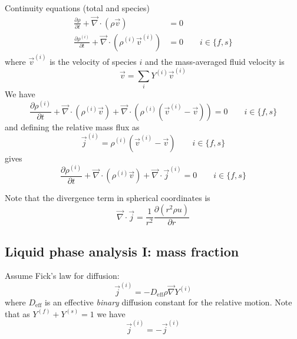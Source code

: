 \documentclass[11pt,twoside]{report}
\begin{document}
Continuity equations (total and species)
\begin{align}
  \label{eq:total-continuity}
  \frac{\partial \rho}{\partial t} +
  \vec{\nabla} \cdot (\rho \vec{v}) &= 0 \\
  \label{eq:species-continuity}
  \frac{\partial \rho^{(i)}}{\partial t} +
  \vec{\nabla} \cdot (\rho^{(i)} \vec{v}^{(i)}) &= 0
  \qquad i \in \{f,s\}
\end{align}
where $\vec{v}^{(i)}$ is the velocity of species $i$ and the mass-averaged fluid velocity is
\begin{equation}
  \vec{v} = \sum_i Y^{(i)} \vec{v}^{(i)}
\end{equation}
We have
\begin{equation*}
  \frac{\partial \rho^{(i)}}{\partial t} +
  \vec{\nabla} \cdot (\rho^{(i)} \vec{v}) +
  \vec{\nabla} \cdot (\rho^{(i)} (\vec{v}^{(i)} - \vec{v})) = 0
  \qquad i \in \{f,s\}
\end{equation*}
and defining the relative mass flux as
\begin{equation}\label{eq:relative-mass-flux}
  \vec{j}^{(i)} = \rho^{(i)} (\vec{v}^{(i)} - \vec{v})
  \qquad i \in \{f,s\}
\end{equation}
gives
\begin{equation}\label{eq:species-continuity-relative}
  \frac{\partial \rho^{(i)}}{\partial t} +
  \vec{\nabla} \cdot (\rho^{(i)} \vec{v}) +
  \vec{\nabla} \cdot \vec{j}^{(i)} = 0
  \qquad i \in \{f,s\}
\end{equation}

Note that the divergence term in spherical coordinates is
\begin{equation*}
  \vec{\nabla} \cdot \vec{j} =
  \frac{1}{r^2} \frac{\partial (r^2 \rho u)}{\partial r}
\end{equation*}

\subsection{Liquid phase analysis I: mass fraction}

Assume Fick's law for diffusion:
\begin{equation}\label{eq:ficks-law}
  \vec{j}^{(i)} = -D_{\textrm{eff}} \rho \vec{\nabla} Y^{(i)}
\end{equation}
where $D_{\textrm{eff}}$ is an effective \emph{binary} diffusion constant for the relative motion.
Note that as $Y^{(f)} + Y^{(s)} = 1$ we have
\begin{equation*}
  \vec{j}^{(i)} = -\vec{j}^{(i)}
\end{equation*}
\end{document}
